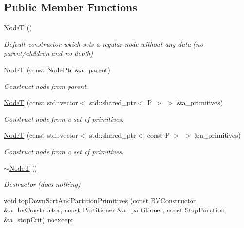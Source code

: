 \subsection*{Public Member Functions}
\begin{DoxyCompactItemize}
\item 
\mbox{\label{classBVH_1_1NodeT_a960d0972bec81cf782b36e57f87da1f1}} 
\hyperlink{classBVH_1_1NodeT_a960d0972bec81cf782b36e57f87da1f1}{NodeT} ()
\begin{DoxyCompactList}\small\item\em Default constructor which sets a regular node without any data (no parent/children and no depth) \end{DoxyCompactList}\item 
\hyperlink{classBVH_1_1NodeT_a8867e5e1c47d12eff7a468b2e240f16b}{NodeT} (const \hyperlink{classBVH_1_1NodeT_a008f5c2c53adb1f5730d8478b48529b1}{Node\+Ptr} \&a\+\_\+parent)
\begin{DoxyCompactList}\small\item\em Construct node from parent. \end{DoxyCompactList}\item 
\hyperlink{classBVH_1_1NodeT_a6da86ccc8e4a0c556cd67ca59af983dc}{NodeT} (const std\+::vector$<$ std\+::shared\+\_\+ptr$<$ P $>$ $>$ \&a\+\_\+primitives)
\begin{DoxyCompactList}\small\item\em Construct node from a set of primitives. \end{DoxyCompactList}\item 
\hyperlink{classBVH_1_1NodeT_a6312ce04f70c2e1a860ce380298909b6}{NodeT} (const std\+::vector$<$ std\+::shared\+\_\+ptr$<$ const P $>$ $>$ \&a\+\_\+primitives)
\begin{DoxyCompactList}\small\item\em Construct node from a set of primitives. \end{DoxyCompactList}\item 
\mbox{\label{classBVH_1_1NodeT_a5bc328f2381b6babe37496758ea4b583}} 
\hyperlink{classBVH_1_1NodeT_a5bc328f2381b6babe37496758ea4b583}{$\sim$\+NodeT} ()
\begin{DoxyCompactList}\small\item\em Destructor (does nothing) \end{DoxyCompactList}\item 
void \hyperlink{classBVH_1_1NodeT_acae5a575fa8b236de984fdd41e04c038}{top\+Down\+Sort\+And\+Partition\+Primitives} (const \hyperlink{classBVH_1_1NodeT_a2340f2466ed5b6eebab4bdc72004858e}{B\+V\+Constructor} \&a\+\_\+bv\+Constructor, const \hyperlink{classBVH_1_1NodeT_a3bb028655b8b961fa35109af1c14f281}{Partitioner} \&a\+\_\+partitioner, const \hyperlink{classBVH_1_1NodeT_acbe56195affc439febe8aca84db308e3}{Stop\+Function} \&a\+\_\+stop\+Crit) noexcept

\end{DoxyCompactItemize}
